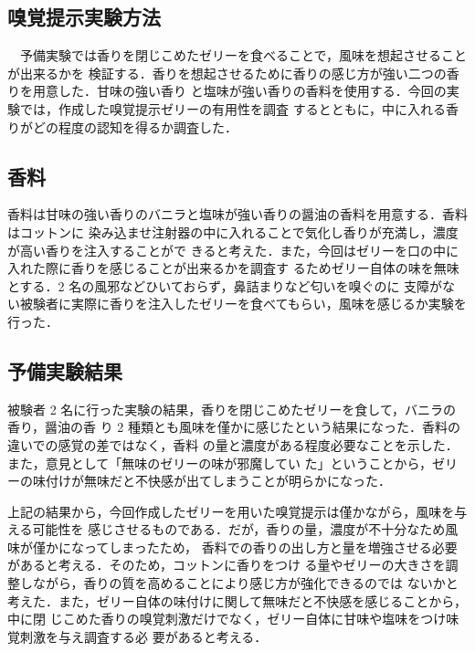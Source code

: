 \subsection{嗅覚提示実験方法}

　予備実験では香りを閉じこめたゼリーを食べることで，風味を想起させることが出来るかを
検証する．香りを想起させるために香りの感じ方が強い二つの香りを用意した．甘味の強い香り
と塩味が強い香りの香料を使用する．今回の実験では，作成した嗅覚提示ゼリーの有用性を調査
するとともに，中に入れる香りがどの程度の認知を得るか調査した．


\subsection{香料}

香料は甘味の強い香りのバニラと塩味が強い香りの醤油の香料を用意する．香料はコットンに
染み込ませ注射器の中に入れることで気化し香りが充満し，濃度が高い香りを注入することがで
きると考えた．また，今回はゼリーを口の中に入れた際に香りを感じることが出来るかを調査す
るためゼリー自体の味を無味とする．2 名の風邪などひいておらず，鼻詰まりなど匂いを嗅ぐのに
支障がない被験者に実際に香りを注入したゼリーを食べてもらい，風味を感じるか実験を行った．


\subsection{予備実験結果}

被験者 2 名に行った実験の結果，香りを閉じこめたゼリーを食して，バニラの香り，醤油の香
り 2 種類とも風味を僅かに感じたという結果になった．香料の違いでの感覚の差ではなく，香料
の量と濃度がある程度必要なことを示した．また，意見として「無味のゼリーの味が邪魔してい
た」ということから，ゼリーの味付けが無味だと不快感が出てしまうことが明らかになった．


上記の結果から，今回作成したゼリーを用いた嗅覚提示は僅かながら，風味を与える可能性を
感じさせるものである．だが，香りの量，濃度が不十分なため風味が僅かになってしまったため，
香料での香りの出し方と量を増強させる必要があると考える．そのため，コットンに香りをつけ
る量やゼリーの大きさを調整しながら，香りの質を高めることにより感じ方が強化できるのでは
ないかと考えた．また，ゼリー自体の味付けに関して無味だと不快感を感じることから，中に閉
じこめた香りの嗅覚刺激だけでなく，ゼリー自体に甘味や塩味をつけ味覚刺激を与え調査する必
要があると考える．
